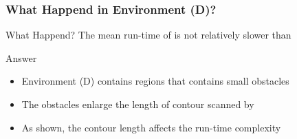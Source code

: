 \begin{frame}
\frametitle{What Happend in Environment (D)?}

\begin{alertblock}{What Happend?}
	The mean run-time of \WFD is not relatively slower than \FFD
\end{alertblock}
\pause
\begin{exampleblock}{Answer}
	\begin{itemize}
	  \item Environment (D) contains regions that contains small obstacles
	  \item The obstacles enlarge the length of contour scanned by \FFD
	  \item As shown, the contour length affects the run-time complexity
	\end{itemize}
\end{exampleblock}

\begin{figure} 
 \centering
\end{figure}

\end{frame}

